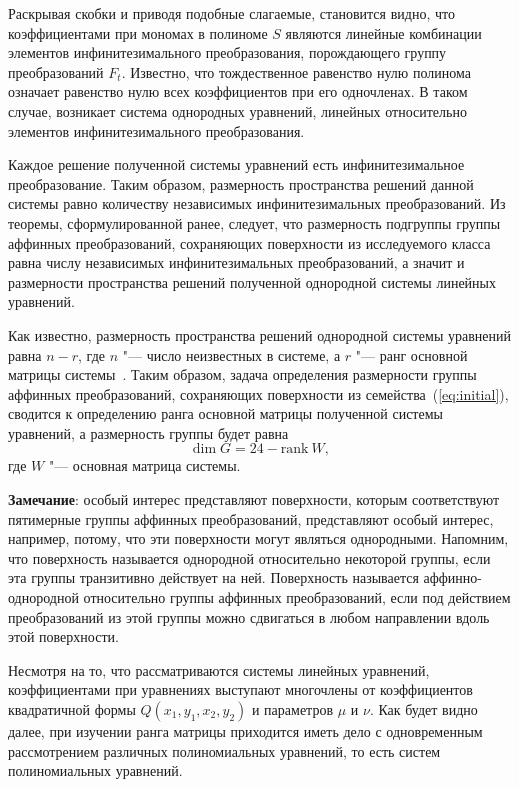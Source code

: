 \documentclass[../main.tex]{subfiles}
\begin{document}
Раскрывая скобки и приводя подобные слагаемые, становится видно, что коэффициентами при мономах в полиноме $S$ являются линейные комбинации элементов инфинитезимального преобразования, порождающего группу преобразований $F_t$. Известно, что тождественное равенство нулю полинома означает равенство нулю всех коэффициентов при его одночленах. В таком случае, возникает система однородных уравнений, линейных относительно элементов инфинитезимального преобразования. 

Каждое решение полученной системы уравнений есть инфинитезимальное преобразование. Таким образом, размерность пространства решений данной системы равно количеству независимых инфинитезимальных преобразований. Из теоремы, сформулированной ранее, следует, что размерность подгруппы группы аффинных преобразований, сохраняющих поверхности из исследуемого класса равна числу независимых инфинитезимальных преобразований, а значит и размерности пространства решений полученной однородной системы линейных уравнений.

Как известно, размерность пространства решений однородной системы уравнений равна $n - r$, где $n$ "--- число неизвестных в системе, а $r$ "--- ранг основной матрицы системы~\cite{costrikin_va1}. Таким образом, задача определения размерности группы аффинных преобразований, сохраняющих поверхности из семейства~(\ref{eq:initial}), сводится к определению ранга основной матрицы полученной системы уравнений, а размерность группы будет равна
\begin{equation}\label{eq:dim_rank}
\dim G = 24 - \mathrm{rank}~W,
\end{equation}
где $W$ "--- основная матрица системы. 

\textbf{Замечание}: особый интерес представляют поверхности, которым соответствуют пятимерные группы аффинных преобразований, представляют особый интерес, например, потому, что эти поверхности могут являться однородными. Напомним, что поверхность называется однородной относительно некоторой группы, если эта группы транзитивно действует на ней. Поверхность называется аффинно-однородной относительно группы аффинных преобразований, если под действием преобразований из этой группы можно сдвигаться в любом направлении вдоль этой поверхности.

Несмотря на то, что рассматриваются системы линейных уравнений, коэффициентами при уравнениях выступают многочлены от коэффициентов квадратичной формы $Q(x_1, y_1, x_2, y_2)$ и параметров $\mu$ и $\nu$. Как будет видно далее, при изучении ранга матрицы приходится иметь дело с одновременным рассмотрением различных полиномиальных уравнений, то есть систем полиномиальных уравнений.  
\end{document}
